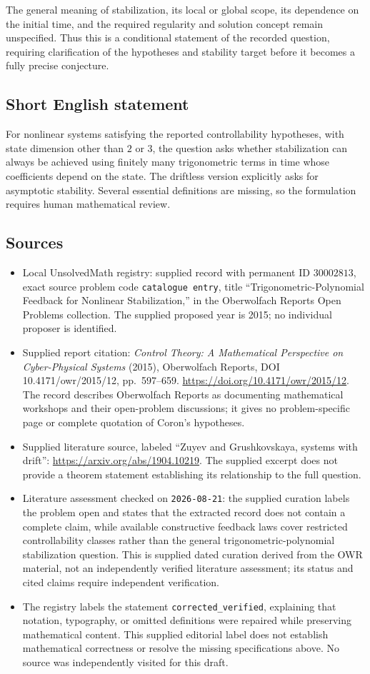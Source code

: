 \documentclass[11pt]{article}
\begin{document}
The general meaning of stabilization, its local or global scope, its dependence on the initial time, and the required regularity and solution concept remain unspecified. Thus this is a conditional statement of the recorded question, requiring clarification of the hypotheses and stability target before it becomes a fully precise conjecture.
\subsection{Short English statement}
For nonlinear systems satisfying the reported controllability hypotheses, with state dimension other than \(2\) or \(3\), the question asks whether stabilization can always be achieved using finitely many trigonometric terms in time whose coefficients depend on the state. The driftless version explicitly asks for asymptotic stability. Several essential definitions are missing, so the formulation requires human mathematical review.
\subsection{Sources}
\begin{itemize}
\item Local UnsolvedMath registry: supplied record with permanent ID \(30002813\), exact source problem code \texttt{catalogue entry}, title ``Trigonometric-Polynomial Feedback for Nonlinear Stabilization,'' in the Oberwolfach Reports Open Problems collection. The supplied proposed year is 2015; no individual proposer is identified.
\item Supplied report citation: \emph{Control Theory: A Mathematical Perspective on Cyber-Physical Systems} (2015), Oberwolfach Reports, DOI 10.4171/owr/2015/12, pp.\ 597--659. \url{https://doi.org/10.4171/owr/2015/12}. The record describes Oberwolfach Reports as documenting mathematical workshops and their open-problem discussions; it gives no problem-specific page or complete quotation of Coron's hypotheses.
\item Supplied literature source, labeled ``Zuyev and Grushkovskaya, systems with drift'': \url{https://arxiv.org/abs/1904.10219}. The supplied excerpt does not provide a theorem statement establishing its relationship to the full question.
\item Literature assessment checked on \texttt{2026-08-21}: the supplied curation labels the problem open and states that the extracted record does not contain a complete claim, while available constructive feedback laws cover restricted controllability classes rather than the general trigonometric-polynomial stabilization question. This is supplied dated curation derived from the OWR material, not an independently verified literature assessment; its status and cited claims require independent verification.
\item The registry labels the statement \texttt{corrected\_verified}, explaining that notation, typography, or omitted definitions were repaired while preserving mathematical content. This supplied editorial label does not establish mathematical correctness or resolve the missing specifications above. No source was independently visited for this draft.
\end{itemize}
\end{document}

